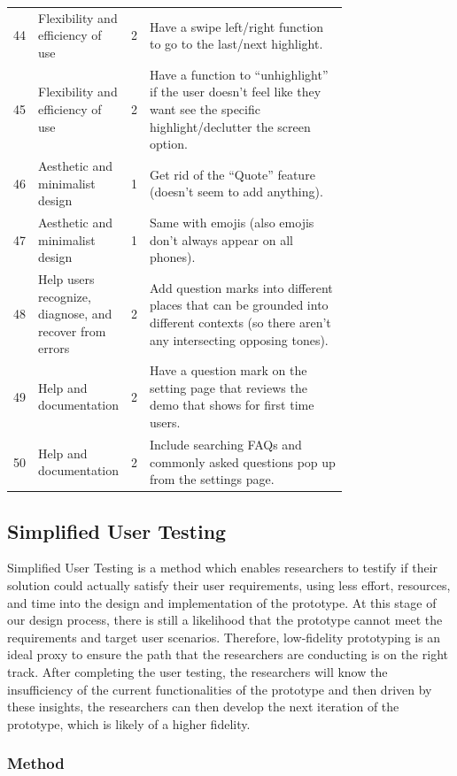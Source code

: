 \documentclass[acmsmall,screen,authorversion,nonacm]{acmart}
\begin{document}
\begin{center}
\begin{longtable}{|l|p{0.15\linewidth}|l|p{0.6\linewidth}|}
44 & Flexibility and efficiency of use & 2 & Have a swipe left/right function to go to the last/next highlight. \\ \cline{1-4}
45 & Flexibility and efficiency of use & 2 & Have a function to “unhighlight” if the user doesn’t feel like they want see the specific highlight/declutter the screen option. \\ \cline{1-4}
46 & Aesthetic and minimalist design & 1 & Get rid of the “Quote” feature (doesn’t seem to add anything). \\ \cline{1-4}
47 & Aesthetic and minimalist design & 1 & Same with emojis (also emojis don’t always appear on all phones). \\ \cline{1-4}
48 & Help users recognize, diagnose, and recover from errors & 2 & Add question marks into different places that can be grounded into different contexts (so there aren’t any intersecting opposing tones). \\ \cline{1-4}
49 & Help and documentation & 2 & Have a question mark on the setting page that reviews the demo that shows for first time users. \\ \cline{1-4}
50 & Help and documentation & 2 & Include searching FAQs and commonly asked questions pop up from the settings page. \\ \cline{1-4}

\end{longtable}
\end{center}

\subsection{Simplified User Testing}

Simplified User Testing is a method which enables researchers to testify if their solution could actually satisfy their user requirements, using less effort, resources, and time into the design and implementation of the prototype. At this stage of our design process, there is still a likelihood that the prototype cannot meet the requirements and target user scenarios. Therefore, low-fidelity prototyping is an ideal proxy to ensure the path that the researchers are conducting is on the right track. After completing the user testing, the researchers will know the insufficiency of the current functionalities of the prototype and then driven by these insights, the researchers can then develop the next iteration of the prototype, which is likely of a higher fidelity.

\subsubsection{Method}
\end{document}
